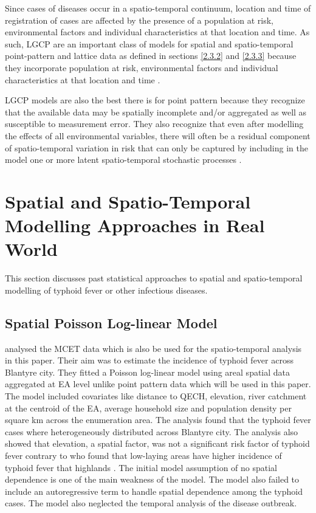 Since cases of diseases occur in a spatio-temporal continuum, location and time of registration of cases are affected by the presence of a population at risk, environmental factors and individual characteristics at that location and time. As such, LGCP are an important class of models for spatial and spatio-temporal point-pattern and lattice data as defined in sections \ref{2.3.2} and \ref{2.3.3} because they incorporate population at risk, environmental factors and individual characteristics at that location and time \citep{Taylor:2015}. 

LGCP models are also the best there is for point pattern because they recognize that the available data may be spatially incomplete and/or aggregated as well as susceptible to measurement error. They also recognize that even after modelling the effects of all environmental variables, there will often be a
residual component of spatio-temporal variation in risk that can only be captured by including in the model one or more latent spatio-temporal stochastic processes \citep{Taylor:2015}.

\section{Spatial and Spatio-Temporal Modelling Approaches in Real World}

This section discusses past statistical approaches to spatial and spatio-temporal modelling of typhoid fever or other infectious diseases.

\subsection{Spatial Poisson Log-linear Model}

\citet{Gauld:2022} analysed the MCET data which is also be used for the spatio-temporal analysis in this paper. Their aim was to estimate the incidence of typhoid fever across Blantyre city. They fitted a Poisson log-linear model using areal spatial data aggregated at EA level unlike point pattern data which will be used in this paper. The model included covariates like distance to QECH, elevation, river catchment at the centroid of the EA, average household size and population density per square km across the enumeration area. The analysis found that the typhoid fever cases where heterogeneously distributed across Blantyre city. The analysis also showed that elevation, a spatial factor, was not a significant risk factor of typhoid fever contrary to \citep{Akullian:2015} who found that low-laying areas have higher incidence of typhoid fever that highlands \citep{Gauld:2022, Akullian:2015}. The initial model assumption of no spatial dependence is one of the main weakness of the model. The model also failed to include an autoregressive term to handle spatial dependence among the typhoid cases. The model also neglected the temporal analysis of the disease outbreak.

